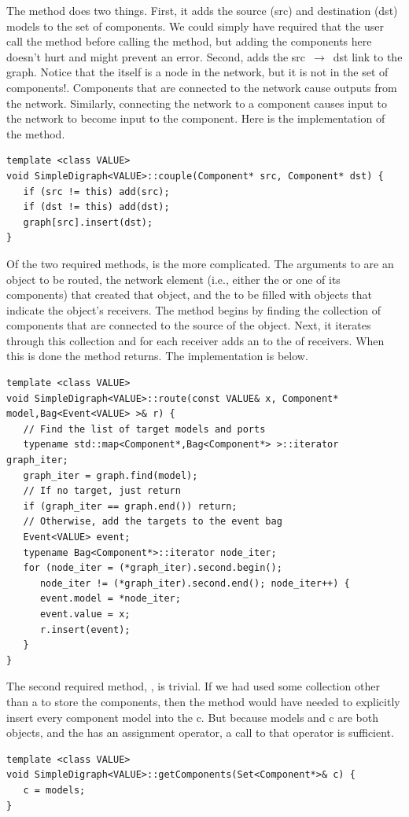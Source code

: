 The  method does two things. First, it adds the source (src) and destination (dst) models to the set of components. We could simply have required that the user call the  method before calling the  method, but adding the components here doesn't hurt and might prevent an error. Second,  adds the \mbox{src $\rightarrow$ dst} link to the graph. Notice that the  itself is a node in the network, but it is not in the set of components!. Components that are connected to the network cause outputs from the network. Similarly, connecting the network to a component causes input to the network to become input to the component. Here is the implementation of the  method.
\begin{verbatim}
template <class VALUE>
void SimpleDigraph<VALUE>::couple(Component* src, Component* dst) {
   if (src != this) add(src);
   if (dst != this) add(dst);
   graph[src].insert(dst);
}
\end{verbatim}

Of the two required methods,  is the more complicated. The arguments to  are an object to be routed, the network element (i.e., either the  or one of its components) that created that object, and the  to be filled with  objects that indicate the object's receivers. The method begins by finding the collection of components that are connected to the source of the object. Next, it iterates through this collection and for each receiver adds an  to the  of receivers. When this is done the method returns. The implementation is below.
\begin{verbatim}
template <class VALUE>
void SimpleDigraph<VALUE>::route(const VALUE& x, Component* model,Bag<Event<VALUE> >& r) {
   // Find the list of target models and ports
   typename std::map<Component*,Bag<Component*> >::iterator graph_iter;
   graph_iter = graph.find(model);
   // If no target, just return
   if (graph_iter == graph.end()) return;
   // Otherwise, add the targets to the event bag
   Event<VALUE> event;
   typename Bag<Component*>::iterator node_iter;
   for (node_iter = (*graph_iter).second.begin();
      node_iter != (*graph_iter).second.end(); node_iter++) {
      event.model = *node_iter;
      event.value = x;
      r.insert(event);
   }
}
\end{verbatim}

The second required method, , is trivial. If we had used some collection other than a  to store the components, then the method would have needed to explicitly insert every component model into the  c. But because models and c are both  objects, and the  has an assignment operator, a call to that operator is sufficient.
\begin{verbatim}
template <class VALUE>
void SimpleDigraph<VALUE>::getComponents(Set<Component*>& c) {
   c = models;
}
\end{verbatim}

